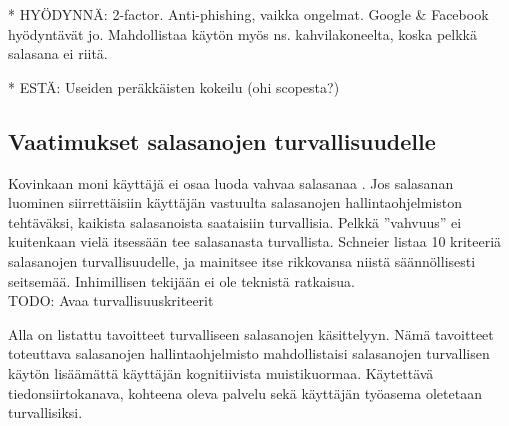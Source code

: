 \documentclass[english,gradu]{tktltiki}
\begin{document}
* HYÖDYNNÄ: 2-factor. Anti-phishing, vaikka ongelmat. Google \& Facebook hyödyntävät jo. Mahdollistaa käytön myös ns. kahvilakoneelta, koska pelkkä salasana ei riitä.

* ESTÄ: Useiden peräkkäisten kokeilu (ohi scopesta?)



\subsection{Vaatimukset salasanojen turvallisuudelle} %
\label{sub:vaatimukset_salasanojen_turvallisuudelle}


         Kovinkaan moni käyttäjä ei osaa luoda vahvaa salasanaa \cite{generating_and_remembering_pws_04, password_management_strategies_06}. Jos salasanan luominen siirrettäisiin käyttäjän vastuulta salasanojen hallintaohjelmiston tehtäväksi, kaikista salasanoista saataisiin turvallisia. Pelkkä ''vahvuus'' ei kuitenkaan vielä itsessään tee salasanasta turvallista.
         Schneier \cite{schneier_password_advice_09} listaa 10 kriteeriä salasanojen turvallisuudelle, ja mainitsee itse rikkovansa niistä säännöllisesti seitsemää. Inhimillisen tekijään ei ole teknistä ratkaisua.
         \\
         TODO: Avaa turvallisuuskriteerit

         Alla on listattu tavoitteet turvalliseen salasanojen käsittelyyn. Nämä tavoitteet toteuttava salasanojen hallintaohjelmisto mahdollistaisi salasanojen turvallisen käytön lisäämättä käyttäjän kognitiivista muistikuormaa. Käytettävä tiedonsiirtokanava, kohteena oleva palvelu sekä käyttäjän työasema oletetaan turvallisiksi.
\end{document}
